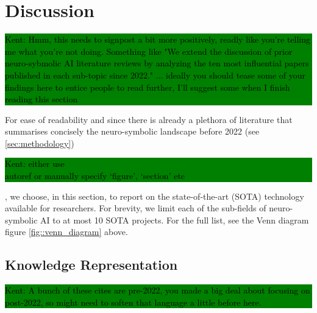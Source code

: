 \documentclass[hf]{ceurart}
\newcommand{\pinaforecomment}[4]{\colorbox{#1}{\textcolor{#4}{\parbox{.8\linewidth}{#2: #3}}}}
\newcommand{\osullikomment}[1]{\pinaforecomment{green}{Kent}{#1}{black}}
\begin{document}
\section{Discussion}\label{sec:discussion}

\osullikomment{Hmm, this needs to signpost a bit more positively, readly like you're telling me what you're not doing. Something like "We extend the discussion of prior neuro-sybmolic AI literature reviews by analyzing the ten most influential papers published in each sub-topic since 2022." ...  ideally you should tease some of your findings here to entice people to read further, I'll suggest some when I finish reading this section }

For ease of readability and since there is already a plethora of literature that summarises concisely the neuro-symbolic landscape before 2022 (see \ref{sec:methodology})
\osullikomment{either use \\autoref or manually specify `figure', `section' etc }, we choose, in this section,  to report on the state-of-the-art (SOTA) technology available for researchers. For brevity, we limit each of the sub-fields of neuro-symbolic AI to at most 10 SOTA projects. For the full list, see the Venn diagram figure \ref{fig::venn_diagram} above. 

\subsection{Knowledge Representation}\label{subsec:disc_knowledge}

\osullikomment{A bunch of these cites are pre-2022, you made a big deal about focusing on post-2022, so might need to soften that language a little before here.}
\end{document}

